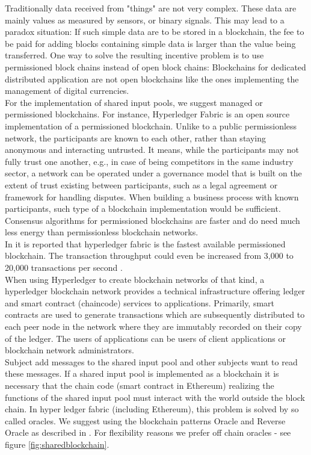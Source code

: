 Traditionally data received from "things" are not very complex. These data are mainly values as measured by sensors, or binary signals. This may lead to a paradox situation: If such simple data are to be stored in a blockchain, the fee to be paid for adding blocks containing simple data is larger than the value being transferred. 
One way to solve the resulting incentive problem is to use permissioned block chains instead of open block chains: Blockchains for dedicated distributed application are not open blockchains like the ones implementing the management of digital currencies. 
\\
For the implementation of shared input pools, we suggest managed or permissioned blockchains. For instance, Hyperledger Fabric \cite{article:hyperledger} is an open source implementation of a permissioned blockchain. Unlike to a public permissionless network, the participants are known to each other, rather than staying anonymous and interacting untrusted. It means, while the participants may not fully trust one another, e.g., in case of being competitors in the same industry sector, a network can be operated under a governance model that is built on the extent of trust existing between participants, such as a legal agreement or framework for handling disputes. When building a business process with known participants, such type of a blockchain implementation would be sufficient. Consensus algorithms for permissioned blockchains are faster and do need much less energy than permissionless blockchain networks. 
\\
In \cite{article:Blockbench} it is reported that hyperledger fabric is the fastest available permissioned blockchain. The transaction throughput could even be increased from 3,000 to 20,000 transactions per second \cite{article:hyperledgerfabric}.
\\
When using Hyperledger to create blockchain networks of that kind, a hyperledger blockchain network provides a technical infrastructure offering ledger and smart contract (chaincode) services to applications. Primarily, smart contracts are used to generate transactions which are subsequently distributed to each peer node in the network where they are immutably recorded on their copy of the ledger. The users of applications can be users of client applications or blockchain network administrators.
\\
Subject add messages to the shared input pool and other subjects want to read these messages. If a shared input pool is implemented as a blockchain it is necessary that the chain code (smart contract in Ethereum) realizing the functions of the shared input pool must interact with the world outside the block chain. In hyper ledger fabric (including Ethereum), this problem is solved by so called oracles. We suggest using the blockchain patterns Oracle and Reverse Oracle as described in \cite{book:Blockchainapplications}. For flexibility reasons we prefer off chain oracles - see figure \ref{fig:sharedblockchain}.



